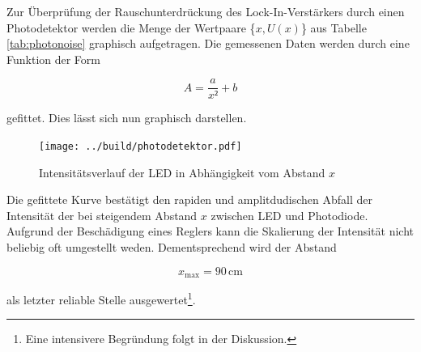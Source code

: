 Zur Überprüfung der Rauschunterdrückung des Lock-In-Verstärkers durch einen Photodetektor werden die Menge der Wertpaare
\{$x,U(x)$\} aus Tabelle \ref{tab:photonoise} graphisch aufgetragen. Die gemessenen Daten werden durch eine Funktion der Form

\begin{equation*}
    A = \frac{a}{x²} + b
\end{equation*}

\noindent gefittet. Dies lässt sich nun graphisch darstellen.

\begin{figure}
    \centering
    \texttt{[image: ../build/photodetektor.pdf]}
    \caption{Intensitätsverlauf der LED in Abhängigkeit vom Abstand $x$}
    \label{fig:photoabb}
\end{figure}

\noindent Die gefittete Kurve bestätigt den rapiden und amplitdudischen Abfall der Intensität der bei steigendem
Abstand $x$ zwischen LED und Photodiode.\\
Aufgrund der Beschädigung eines Reglers kann die Skalierung der Intensität nicht beliebig oft umgestellt weden. 
Dementsprechend wird der Abstand 

\begin{equation*}
    x_\text{max} = 90\,\unit{\centi\meter}
\end{equation*}

\noindent als letzter reliable Stelle ausgewertet\footnote{Eine intensivere Begründung folgt in der Diskussion.}.

